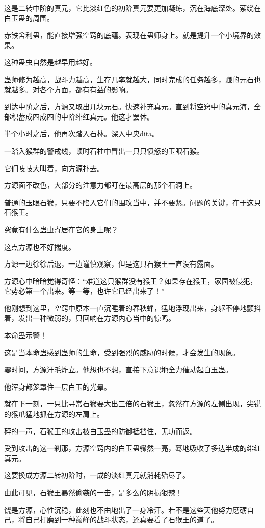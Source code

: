 \begin{this_body}
这是二转中阶的真元，它比淡红色的初阶真元要更加凝练，沉在海底深处。萦绕在白玉蛊的周围。

赤铁舍利蛊，能直接增强空窍的底蕴。表现在蛊师身上。就是提升一个小境界的效果。

这种蛊虫自然是越早用越好。

蛊师修为越高，战斗力越高，生存几率就越大，同时完成的任务越多，赚的元石也就越多。对各个方面，都有有益的影响。

到达中阶之后，方源又取出几块元石。快速补充真元。直到将空窍中的真元海，全部积蓄成四成四的中阶绯红真元。他这才罢休。

半个小时之后，他再次踏入石林。深入中央dita。

一踏入猴群的警戒线，顿时石柱中冒出一只只愤怒的玉眼石猴。

它们吱吱大叫着，向方源扑去。

方源面不改色，大部分的注意力都盯在最高层的那个石洞上。

普通的玉眼石猴，只要不陷入它们的围攻当中，并不要紧。问题的关键，在于这只石猴王。

究竟有什么蛊虫寄居在它的身上呢？

这点方源也不好揣度。

方源一边徐徐后退，一边谨慎观察，但是这只石猴王一直没有露面。

方源心中暗暗觉得奇怪：“难道这只猴群没有猴王？如果存在猴王，家园被侵犯，它势必第一个出来。等一等，也许它已经出来了！”

他刚想到这里，空窍中原本一直沉睡着的春秋蝉，猛地浮现出来，身躯不停地颤抖着，发出一种微弱的，只回响在方源内心当中的惊鸣。

本命蛊示警！

这是当本命蛊感到蛊师的生命，受到强烈的威胁的时候，才会发生的现象。

霎时间，方源汗毛炸立。他想也不想，直接下意识地全力催动起白玉蛊。

他浑身都笼罩住一层白玉的光晕。

就在下一刻，一只比寻常石猴要大出三倍的石猴王，忽然在方源的左侧出现，尖锐的猴爪猛地抓在方源的左肩上。

砰的一声，石猴王的攻击被白玉蛊的防御抵挡住，无功而返。

受到攻击的这一刹那，方源空窍内的白玉蛊骤然一亮，蓦地吸收了多达半成的绯红真元。

这要换成方源二转初阶时，一成的淡红真元就消耗殆尽了。

由此可见，石猴王暴然偷袭的一击，是多么的阴损狠辣！

饶是方源，心性沉稳，此刻也不由地出了一身冷汗。若不是这些天他努力磨砺自己，将自己打磨到一种巅峰的战斗状态，还真要着了石猴王的道了。


\end{this_body}
